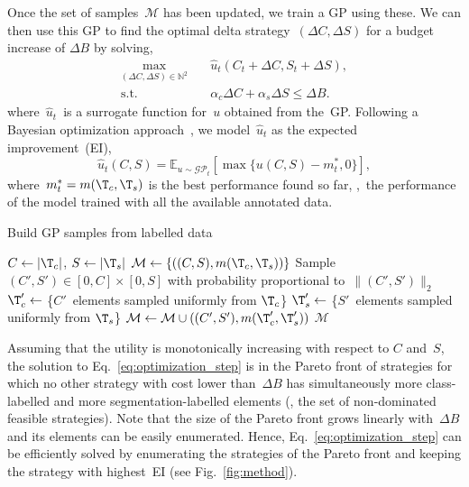 Once the set of samples~$\mathcal{M}$ has been updated, we train a GP using these. %
We can then use this GP to find the optimal delta strategy~$(\Delta{}C, \Delta{}S)$ for a budget increase of $\Delta{}B$ by solving,
\begin{equation}
\label{eq:optimization_step}
\begin{aligned}
    \max_{(\Delta{}C,\Delta{}S)\in\mathbb{N}^2} \quad & \hat{u}_t(C_t + \Delta{}C, S_t + \Delta{}S), \\
    \textrm{s.t.} \quad & \alpha_c\Delta{}C + \alpha_s\Delta{}S \le \Delta{}B.
\end{aligned}
\end{equation}
where~$\hat{u}_t$~is a surrogate function for~$u$ obtained from the~GP. Following a Bayesian optimization approach~, we model~$\hat{u}_t$ as the expected improvement~(EI),
\begin{equation}
    \hat{u}_t(C, S) = \mathbb{E}_{u\sim\mathcal{GP}_t}[\max\{u(C, S) - m^*_t, 0\}],
    \label{eq:EI}
\end{equation}
where~$m^*_t=m(\T_c, \T_s)$ is the best performance found so far, \ie,~the performance of the model trained with all the available annotated data.


\begin{algorithm}[t!]
\caption{Build GP samples from labelled data}
\label{alg:build_gp_samples}
\begin{algorithmic}[1]
    \State $C \leftarrow |\T_c|$, $S \leftarrow |\T_s|$
    \State $\mathcal{M} \leftarrow \{((C, S), m(\T_c,\T_s))\}$ 
    \State Sample $(C', S')\in[0, C]\times[0, S]$ with probability proportional to~$\|(C',S')\|_2$
    \State $\T'_c \leftarrow$ \{$C'$~elements sampled uniformly from $\T_c$\}
    \State $\T'_s \leftarrow$ \{$S'$~elements sampled uniformly from $\T_s$\}
    \State $\mathcal{M} \leftarrow \mathcal{M} \cup ((C', S'), m(\T'_c, \T'_s))$ 
    \EndRepeat
    \State \Return $\mathcal{M}$
    \EndFunction
\end{algorithmic}
\end{algorithm}

Assuming that the utility is monotonically increasing with respect to $C$ and~$S$, the solution to Eq.~\eqref{eq:optimization_step} is in the Pareto front of strategies for which no other strategy with cost lower than~$\Delta{}B$ has simultaneously more class-labelled and more segmentation-labelled elements (\ie, the set of non-dominated feasible strategies). Note that the size of the Pareto front grows linearly with~$\Delta{}B$ and its elements can be easily enumerated. Hence, Eq.~\eqref{eq:optimization_step} can be efficiently solved by enumerating the strategies of the Pareto front and keeping the strategy with highest~EI (see Fig.~\ref{fig:method}).
\fi
